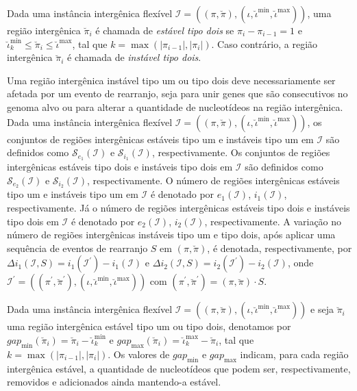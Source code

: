 \begin{definition}
  Dada uma instância intergênica flexível $\mathcal{I} = ((\pi,\breve\pi),(\iota,\breve\iota^{\min},\breve\iota^{\max}))$, uma região intergênica $\breve\pi_i$ é chamada de \emph{estável tipo dois} se $\pi_{i} - \pi_{i - 1} = 1$ e $\breve\iota^{\min}_k \le \breve\pi_i \le \breve\iota^{\max}$, tal que $k = \max(|\pi_{i-1}|, |\pi_i|)$. Caso contrário, a região intergênica $\breve\pi_i$ é chamada de \emph{instável tipo dois}. 
\end{definition}

Uma região intergênica instável tipo um ou tipo dois deve necessariamente ser afetada por um evento de rearranjo, seja para unir genes que são consecutivos no genoma alvo ou para alterar a quantidade de nucleotídeos na região intergênica. Dada uma instância intergênica flexível $\mathcal{I} = ((\pi,\breve\pi),(\iota,\breve\iota^{\min},\breve\iota^{\max}))$, os conjuntos de regiões intergênicas estáveis tipo um e instáveis tipo um em $\mathcal{I}$ são definidos como $\mathcal{S}_{e_{1}}(\mathcal{I})$ e $\mathcal{S}_{i_{1}}(\mathcal{I})$, respectivamente. Os conjuntos de regiões intergênicas estáveis tipo dois e instáveis tipo dois em $\mathcal{I}$ são definidos como $\mathcal{S}_{e_{2}}(\mathcal{I})$ e $\mathcal{S}_{i_{2}}(\mathcal{I})$, respectivamente. O número de regiões intergênicas estáveis tipo um e instáveis tipo um em $\mathcal{I}$ é denotado por $e_1(\mathcal{I})$, $i_1(\mathcal{I})$, respectivamente. Já o número de regiões intergênicas estáveis tipo dois e instáveis tipo dois em $\mathcal{I}$ é denotado por $e_2(\mathcal{I})$, $i_2(\mathcal{I})$, respectivamente. A variação no número de regiões intergênicas instáveis tipo um e tipo dois, após aplicar uma sequência de eventos de rearranjo $S$ em $(\pi,\breve\pi)$, é denotada, respectivamente, por  $\Delta i_1(\mathcal{I},S) = i_1(\mathcal{I}^{\prime}) - i_1(\mathcal{I})$ e $\Delta i_2(\mathcal{I},S) = i_2(\mathcal{I}^{\prime}) - i_2(\mathcal{I})$, onde $\mathcal{I}^{\prime} = ((\pi^{\prime}, \breve\pi^{\prime}),(\iota,\breve\iota^{\min},\breve\iota^{\max}))$ com $(\pi^{\prime}, \breve\pi^{\prime}) = (\pi, \breve\pi) \cdot S$.

Dada uma instância intergênica flexível $\mathcal{I} = ((\pi,\breve\pi),(\iota,\breve\iota^{\min},\breve\iota^{\max}))$ e seja $\breve\pi_i$ uma região intergênica estável tipo um ou tipo dois, denotamos por $gap_{\min}(\breve\pi_i) = \breve\pi_i - \breve\iota^{\min}_k$ e $gap_{\max}(\breve\pi_i) = \breve\iota^{\max}_k - \breve\pi_i$, tal que $k = \max(|\pi_{i-1}|, |\pi_i|)$. Os valores de $gap_{\min}$ e $gap_{\max}$ indicam, para cada região intergênica estável, a quantidade de nucleotídeos que podem ser, respectivamente, removidos e adicionados ainda mantendo-a estável.


